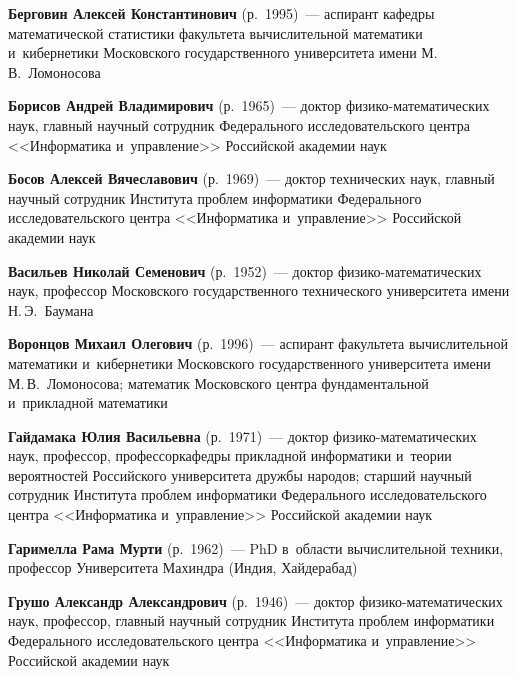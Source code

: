 \begin{multicols}{2}


\noindent
\textbf{Берговин Алексей Константинович} (р.\ 1995)~--- 
аспирант ка\-фед\-ры математической ста\-ти\-сти\-ки факультета вы\-чис\-ли\-тель\-ной математики и~кибернетики Московского 
государственного университета имени М.\,В.~Ломоносова 

\noindent
\textbf{Борисов Андрей Владимирович} (р.\ 1965)~--- доктор фи\-зи\-ко-ма\-те\-ма\-ти\-че\-ских наук, 
главный научный сотрудник Федерального исследовательского цент\-ра <<Информатика и~управ\-ле\-ние>> Российской академии наук

\noindent
\textbf{Босов Алексей Вячеславович} (р.\ 1969)~--- 
доктор технических наук, главный научный сотрудник Института проб\-лем информатики Федерального исследовательского цент\-ра 
<<Информатика и~управ\-ле\-ние>> Российской академии наук



\noindent
\textbf{Васильев Николай Семенович} (р.\ 1952)~--- доктор фи\-зи\-ко-ма\-те\-ма\-ти\-че\-ских наук, 
профессор Московского государственного технического университета имени Н.\,Э.~Баумана

\noindent
\textbf{Воронцов Михаил Олегович} (р.\ 1996)~---
 аспирант факультета вы\-чис\-ли\-тель\-ной математики и~кибернетики Московского государственного университета имени М.\,В.~Ломоносова;
 математик Московского цент\-ра фундаментальной и~при\-клад\-ной матема\-тики



\noindent
\textbf{Гайдамака Юлия Васильевна} (р.\ 1971)~--- доктор фи\-зи\-ко-ма\-те\-ма\-ти\-че\-ских наук, профессор, 
профессор\linebreak ка\-фед\-ры при\-клад\-ной информатики и~тео\-рии ве\-роятностей Российского университета друж\-бы народов; 
старший научный сотрудник Института \mbox{проб\-лем} информатики Федерального исследовательского цент\-ра <<Информатика и~управ\-ле\-ние>>
 Российской академии наук
 
 \noindent
\textbf{Гаримелла Рама Мурти} (р.\ 1962)~---  PhD в~об\-ласти вы\-чис\-ли\-тель\-ной техники, профессор
Университета Махиндра (Индия, Хайдерабад)

\noindent
\textbf{Грушо Александр Александрович} (р.\ 1946)~--- доктор фи\-зи\-ко-ма\-те\-ма\-ти\-че\-ских наук, 
профессор, главный научный сотрудник Института проб\-лем информатики Федерального исследовательского цент\-ра <<Информатика и~управ\-ле\-ние>> Российской академии наук


\end{multicols}
